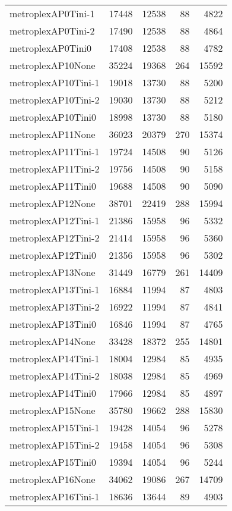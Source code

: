 \begin{longtable}{lrrrr}
metroplexAP0Tini-1 & 17448 & 12538 & 88 & 4822 \\
metroplexAP0Tini-2 & 17490 & 12538 & 88 & 4864 \\
metroplexAP0Tini0 & 17408 & 12538 & 88 & 4782 \\
metroplexAP10None & 35224 & 19368 & 264 & 15592 \\
metroplexAP10Tini-1 & 19018 & 13730 & 88 & 5200 \\
metroplexAP10Tini-2 & 19030 & 13730 & 88 & 5212 \\
metroplexAP10Tini0 & 18998 & 13730 & 88 & 5180 \\
metroplexAP11None & 36023 & 20379 & 270 & 15374 \\
metroplexAP11Tini-1 & 19724 & 14508 & 90 & 5126 \\
metroplexAP11Tini-2 & 19756 & 14508 & 90 & 5158 \\
metroplexAP11Tini0 & 19688 & 14508 & 90 & 5090 \\
metroplexAP12None & 38701 & 22419 & 288 & 15994 \\
metroplexAP12Tini-1 & 21386 & 15958 & 96 & 5332 \\
metroplexAP12Tini-2 & 21414 & 15958 & 96 & 5360 \\
metroplexAP12Tini0 & 21356 & 15958 & 96 & 5302 \\
metroplexAP13None & 31449 & 16779 & 261 & 14409 \\
metroplexAP13Tini-1 & 16884 & 11994 & 87 & 4803 \\
metroplexAP13Tini-2 & 16922 & 11994 & 87 & 4841 \\
metroplexAP13Tini0 & 16846 & 11994 & 87 & 4765 \\
metroplexAP14None & 33428 & 18372 & 255 & 14801 \\
metroplexAP14Tini-1 & 18004 & 12984 & 85 & 4935 \\
metroplexAP14Tini-2 & 18038 & 12984 & 85 & 4969 \\
metroplexAP14Tini0 & 17966 & 12984 & 85 & 4897 \\
metroplexAP15None & 35780 & 19662 & 288 & 15830 \\
metroplexAP15Tini-1 & 19428 & 14054 & 96 & 5278 \\
metroplexAP15Tini-2 & 19458 & 14054 & 96 & 5308 \\
metroplexAP15Tini0 & 19394 & 14054 & 96 & 5244 \\
metroplexAP16None & 34062 & 19086 & 267 & 14709 \\
metroplexAP16Tini-1 & 18636 & 13644 & 89 & 4903 \\

\end{longtable}
